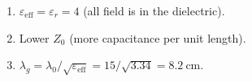 \begin{enumerate}[leftmargin=1.6em,itemsep=2pt]
\item $\varepsilon_{\text{eff}} = \varepsilon_r = 4$ (all field is in the dielectric).
\item Lower $Z_0$ (more capacitance per unit length).
\item $\lambda_g = \lambda_0/\sqrt{\varepsilon_{\text{eff}}} = 15/\sqrt{3.34} = 8.2\ \text{cm}$.
\end{enumerate}
